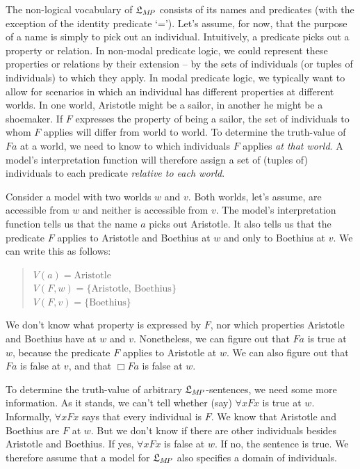 The non-logical vocabulary of $\mathfrak{L}_{M\!P}$ consists of its names and predicates (with
the exception of the identity predicate `='). Let's assume, for now, that the
purpose of a name is simply to pick out an individual. Intuitively, a predicate
picks out a property or relation. In non-modal predicate logic, we could
represent these properties or relations by their extension -- by the sets of
individuals (or tuples of individuals) to which they apply. In modal predicate
logic, we typically want to allow for scenarios in which an individual
has different properties at different worlds. In one world, Aristotle might be a
sailor, in another he might be a shoemaker. If $F$ expresses the property of
being a sailor, the set of individuals to whom $F$ applies will differ from
world to world. To determine the truth-value of $Fa$ at a world, we need to know
to which individuals $F$ applies \emph{at that world}. A model's interpretation
function will therefore assign a set of (tuples of) individuals to each
predicate \emph{relative to each world}.

Consider a model with two worlds $w$ and $v$. Both worlds, let's assume, are
accessible from $w$ and neither is accessible from $v$. The model's
interpretation function tells us that the name $a$ picks out Aristotle. It
also tells us that the predicate $F$ applies to Aristotle and Boethius at $w$
and only to Boethius at $v$. We can write this as follows:
%
\begin{quote}
  $V(a) = \text{Aristotle}$\\
  $V(F,w) = \{ \text{Aristotle, Boethius} \}$\\
  $V(F,v) = \{ \text{Boethius} \}$
\end{quote}
%
\noindent%
We don't know what property is expressed by $F$, nor which properties Aristotle
and Boethius have at $w$ and $v$. Nonetheless, we can figure out that $Fa$ is
true at $w$, because the predicate $F$ applies to Aristotle at $w$. We can also
figure out that $Fa$ is false at $v$, and that $\Box Fa$ is false at $w$.

To determine the truth-value of arbitrary $\mathfrak{L}_{M\!P}$-sentences, we need some
more information. As it stands, we can't tell whether (say) $\forall x Fx$ is
true at $w$. Informally, $\forall x Fx$ says that every individual is $F$. We
know that Aristotle and Boethius are $F$ at $w$. But we don't know if there are
other individuals besides Aristotle and Boethius. If yes, $\forall x Fx$ is
false at $w$. If no, the sentence is true. We therefore assume that a model for
$\mathfrak{L}_{M\!P}$ also specifies a domain of individuals.

